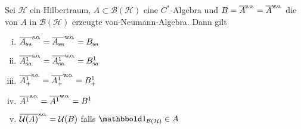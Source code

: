 \begin{satz}[label=satz:624,name={Kaplansky's Dichtesatz}]
	Sei $\mathcal{H}$ ein Hilbertraum, $A \subset \mathcal{B}(\mathcal{H})$ eine $C^*$-Algebra und $B= \overline{A}^\so=\overline{A}^\wo$ die von $A$ in $\mathcal{B}(\mathcal{H})$ erzeugte von-Neumann-Algebra.
	Dann gilt
	\begin{enumerate}[(i),itemsep=2pt]
		\item $\overline{A_\sa}^\so = \overline{A_\sa}^\wo= B_\sa$
		\item $\overline{A_\sa^1}^\so= \overline{A^1_\sa}^\wo = B^1_\sa$
		\item $\overline{A_+^1}^\so = \overline{A_+^1}^\wo= B_+^1$
		\item $\overline{A^1}^\so = \overline{A^1}^\wo = B^1$
		\item $\overline{\mathcal{U}(A)}^\so = \mathcal{U}(B)$ falls $\ind_{\mathcal{B}(\mathcal{H})} \in A$
	\end{enumerate}
\end{satz}
